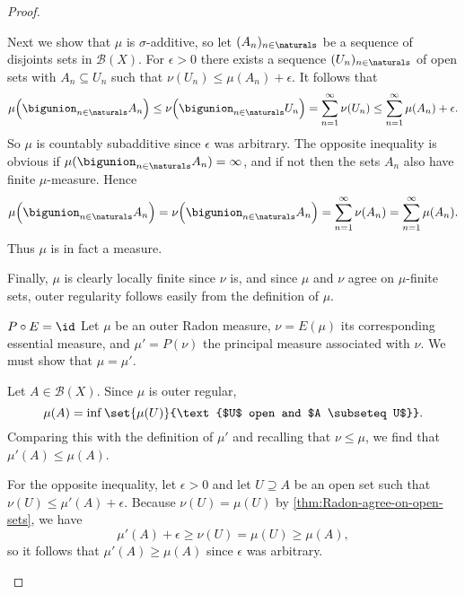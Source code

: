 \documentclass[article, a4paper, 11pt, oneside]{memoir}
\numberwithin{equation}{chapter}
\newcommand{\calB}{\mathcal{B}}
\newcommand{\borel}[1]{\calB(#1)}
\begin{document}
\begin{proof}
\begin{proofsec}
    Next we show that $\mu$ is $\sigma$-additive, so let $(A_n)_{n \in \naturals}$ be a sequence of disjoints sets in $\borel{X}$. For $\epsilon > 0$ there exists a sequence $(U_n)_{n \in \naturals}$ of open sets with $A_n \subseteq U_n$ such that $\nu(U_n) \leq \mu(A_n) + \epsilon$. It follows that
    \begin{equation*}
        \mu \Bigl( \bigunion_{n \in \naturals} A_n \Bigr)
            \leq \nu \Bigl( \bigunion_{n \in \naturals} U_n \Bigr)
            = \sum_{n=1}^\infty \nu(U_n)
            \leq \sum_{n=1}^\infty \mu(A_n) + \epsilon.
    \end{equation*}
    So $\mu$ is countably subadditive since $\epsilon$ was arbitrary. The opposite inequality is obvious if $\mu( \bigunion_{n \in \naturals} A_n ) = \infty$, and if not then the sets $A_n$ also have finite $\mu$-measure. Hence
    \begin{equation*}
        \mu \Bigl( \bigunion_{n \in \naturals} A_n \Bigr)
            = \nu \Bigl( \bigunion_{n \in \naturals} A_n \Bigr)
            = \sum_{n=1}^\infty \nu(A_n)
            = \sum_{n=1}^\infty \mu(A_n).
    \end{equation*}
    Thus $\mu$ is in fact a measure.

    Finally, $\mu$ is clearly locally finite since $\nu$ is, and since $\mu$ and $\nu$ agree on $\mu$-finite sets, outer regularity follows easily from the definition of $\mu$.

    \item[$P \circ E = \id$]
    Let $\mu$ be an outer Radon measure, $\nu = E(\mu)$ its corresponding essential measure, and $\mu' = P(\nu)$ the principal measure associated with $\nu$. We must show that $\mu = \mu'$.

    Let $A \in \borel{X}$. Since $\mu$ is outer regular,
    \begin{equation*}
        \mu(A)
            = \inf \set{\mu(U)}{\text{$U$ open and $A \subseteq U$}}.
    \end{equation*}
    Comparing this with the definition of $\mu'$ and recalling that $\nu \leq \mu$, we find that $\mu'(A) \leq \mu(A)$.

    For the opposite inequality, let $\epsilon > 0$ and let $U \supseteq A$ be an open set such that $\nu(U) \leq \mu'(A) + \epsilon$. Because $\nu(U) = \mu(U)$ by \cref{thm:Radon-agree-on-open-sets}, we have
    \begin{equation*}
        \mu'(A) + \epsilon
            \geq \nu(U)
            = \mu(U)
            \geq \mu(A),
    \end{equation*}
    so it follows that $\mu'(A) \geq \mu(A)$ since $\epsilon$ was arbitrary.


\end{proofsec}
\end{proof}
\end{document}
